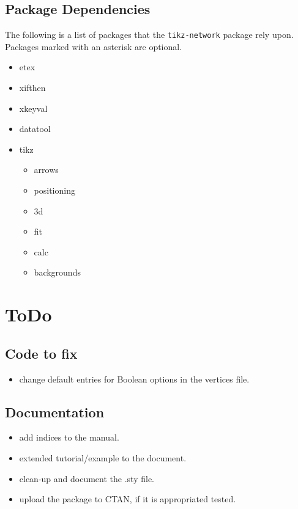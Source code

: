 \documentclass[a4paper,twosided,notoc]{tufte-book}
\newcommand{\doccls}[1]{\texttt{#1}}%
\newcommand{\pkg}{\doccls{tikz-network}\xspace}
\begin{document}
\section{Package Dependencies}\label{sec:dependencies}
The following is a list of packages that the \pkg package rely upon.  Packages marked with an asterisk are optional.
\begin{multicols}{2}
  \begin{itemize}
  \item etex
  \item xifthen
  \item xkeyval
  \item datatool
  \item tikz
    \begin{itemize}
    \item arrows
    \item positioning
    \item 3d
    \item fit
    \item calc
    \item backgrounds
    \end{itemize}
  \end{itemize}
\end{multicols}

\appendix
\chapter{ToDo}
\label{chap:todo}

\section{Code to fix}
\begin{itemize}
\item change default entries for Boolean options in the vertices file.
\end{itemize}

\section{Documentation}
\begin{itemize}
\item add indices to the manual.
\item extended tutorial/example to the document.
\item clean-up and document the .sty file.
\item upload the package to CTAN, if it is appropriated tested.
\end{itemize}
\end{document}
